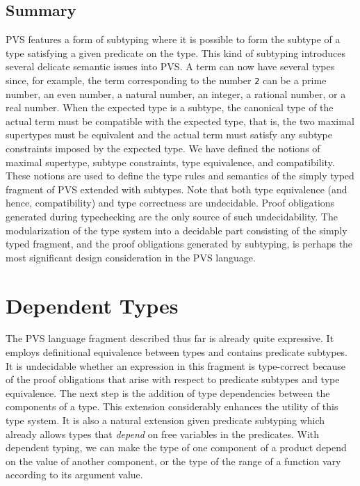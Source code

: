 \documentclass [12pt,twoside]{cslreport}
\begin{document}
\section{Summary}

PVS features a form of subtyping where it is possible to form the subtype
of a type satisfying a given predicate on the type.  This kind of
subtyping introduces several delicate semantic issues into PVS.  A term
can now have several types since, for example, the term corresponding to
the number {\tt 2} can be a prime number, an even number, a natural
number, an integer, a rational number, or a real number.  When the
expected type is a subtype, the canonical type of the actual term must be
compatible with the expected type, that is, the two maximal supertypes
must be equivalent and the actual term must satisfy any subtype
constraints imposed by the expected type.  We have defined the notions of
maximal supertype, subtype constraints, type equivalence, and
compatibility.  These notions are used to define the type rules and
semantics of the simply typed fragment of PVS extended with subtypes.
Note that both type equivalence (and hence, compatibility) and type
correctness are undecidable.  Proof obligations generated during
typechecking are the only source of such undecidability.  The
modularization of the type system into a decidable part consisting of the
simply typed fragment,  and the proof obligations generated by
subtyping, is perhaps the most significant design consideration in the PVS
language.




\chapter{Dependent Types}\label{dependent}

The PVS language fragment described thus far is already quite expressive.
It employs definitional equivalence between types and contains
predicate subtypes.  It is undecidable whether an expression in this
fragment is type-correct because of the proof obligations that arise with
respect to predicate subtypes and type equivalence.  
The next step is the addition of type dependencies between the components
of a type.  This extension considerably
enhances the utility of this type system.  It is also a natural extension
given predicate subtyping which already allows types that
{\em depend\/} on free variables in the predicates.  
With dependent typing, we can
make the type of one component of a product depend on the value of another
component, or the type of the range of a function vary according to its
argument value.
\end{document}
